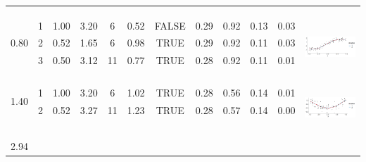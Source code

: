 \begin{table}
\begin{tabular}{ c c c c c c c c c c | c c}
 \\
 \\
 \\[1mm]
\arrayrulecolor{lightgray}\hline \\[-1mm]
\multirow{3}{*}{ 0.80} 
 & 1 & 1.00 & 3.20 & 6 & 0.52 & FALSE & 0.29 & 0.92 & 0.13 & 0.03 & \multirow{6}{*}{ \includegraphics[scale=0.25, trim = 0mm 10mm 0mm 3mm, clip]{tab1_diagnostic_6.png}}\\
 & 2 & 0.52 & 1.65 & 6 & 0.98 & TRUE & 0.29 & 0.92 & 0.11 & 0.03 & \\
 & 3 & 0.50 & 3.12 & 11 & 0.77 & TRUE & 0.28 & 0.92 & 0.11 & 0.01 & \\
 \\
 \\
 \\[1mm]
\arrayrulecolor{lightgray}\hline \\[-1mm]
\multirow{2}{*}{ 1.40} 
 & 1 & 1.00 & 3.20 & 6 & 1.02 & TRUE & 0.28 & 0.56 & 0.14 & 0.01 & \multirow{6}{*}{ \includegraphics[scale=0.25, trim = 0mm 10mm 0mm 3mm, clip]{tab1_diagnostic_7.png}}\\
 & 2 & 0.52 & 3.27 & 11 & 1.23 & TRUE & 0.28 & 0.57 & 0.14 & 0.00 & \\
 \\
 \\
 \\
 \\[1mm]
 \arrayrulecolor{lightgray}\hline \\[-1mm]
\multirow{2}{*}{ 2.94} 

\end{tabular}
\end{table}
